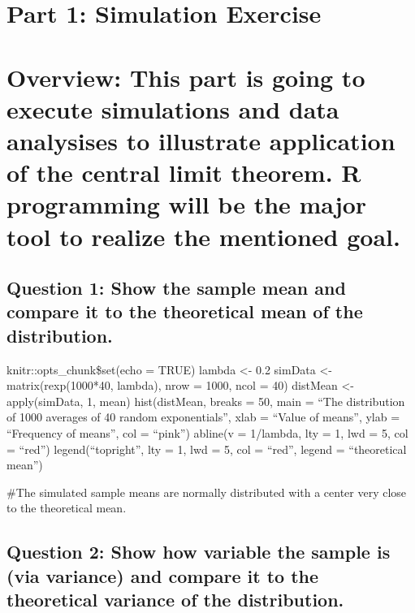 \documentclass[
]{article}
\author{}
\date{\vspace{-2.5em}}
\begin{document}
\hypertarget{part-1-simulation-exercise}{%
\section{Part 1: Simulation Exercise}\label{part-1-simulation-exercise}}

\hypertarget{overview-this-part-is-going-to-execute-simulations-and-data-analysises-to-illustrate-application-of-the-central-limit-theorem.-r-programming-will-be-the-major-tool-to-realize-the-mentioned-goal.}{%
\section{Overview: This part is going to execute simulations and data
analysises to illustrate application of the central limit theorem. R
programming will be the major tool to realize the mentioned
goal.}\label{overview-this-part-is-going-to-execute-simulations-and-data-analysises-to-illustrate-application-of-the-central-limit-theorem.-r-programming-will-be-the-major-tool-to-realize-the-mentioned-goal.}}

\hypertarget{question-1-show-the-sample-mean-and-compare-it-to-the-theoretical-mean-of-the-distribution.}{%
\subsection{Question 1: Show the sample mean and compare it to the
theoretical mean of the
distribution.}\label{question-1-show-the-sample-mean-and-compare-it-to-the-theoretical-mean-of-the-distribution.}}

knitr::opts\_chunk\$set(echo = TRUE) lambda \textless- 0.2 simData
\textless- matrix(rexp(1000*40, lambda), nrow = 1000, ncol = 40)
distMean \textless- apply(simData, 1, mean) hist(distMean, breaks = 50,
main = ``The distribution of 1000 averages of 40 random exponentials'',
xlab = ``Value of means'', ylab = ``Frequency of means'', col =
``pink'') abline(v = 1/lambda, lty = 1, lwd = 5, col = ``red'')
legend(``topright'', lty = 1, lwd = 5, col = ``red'', legend =
``theoretical mean'')

\#The simulated sample means are normally distributed with a center very
close to the theoretical mean.

\hypertarget{question-2-show-how-variable-the-sample-is-via-variance-and-compare-it-to-the-theoretical-variance-of-the-distribution.}{%
\subsection{Question 2: Show how variable the sample is (via variance)
and compare it to the theoretical variance of the
distribution.}\label{question-2-show-how-variable-the-sample-is-via-variance-and-compare-it-to-the-theoretical-variance-of-the-distribution.}}
\end{document}
